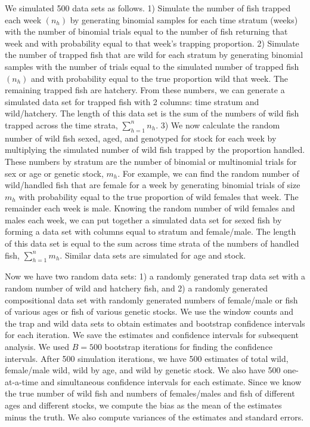 \documentclass[%
                leqno,         %
%
]{nrc1}                          %
\begin{document}
We simulated 500 data sets as follows. 1) Simulate the number of fish trapped each week $(n_h)$ by generating binomial samples for each time stratum (weeks) with the number of binomial trials equal to the number of fish returning that week and with probability equal to that week's trapping proportion. 2) Simulate the number of trapped fish that are wild for each stratum by generating binomial samples with the number of trials equal to the simulated number of trapped fish $(n_h)$ and with probability equal to the true proportion wild that week. The remaining trapped fish are hatchery. From these numbers, we can generate a simulated data set for trapped fish with 2 columns: time stratum and wild/hatchery. The length of this data set is the sum of the numbers of wild fish trapped across the time strata, \(\sum\limits_{h=1}^{n} n_h\). 3) We now calculate the random number of wild fish sexed, aged, and genotyped for stock for each week by multiplying the simulated number of wild fish trapped by the proportion handled. These numbers by stratum are the number of binomial or multinomial trials for sex or age or genetic stock, \(m_h\). For example, we can find the random number of wild/handled fish that are female for a week by generating binomial trials of size \(m_h\) with probability equal to the true proportion of wild females that week. The remainder each week is male. Knowing the random number of wild females and males each week, we can put together a simulated data set for sexed fish by forming a data set with columns equal to stratum and female/male. The length of this data set is equal to the sum across time strata of the numbers of handled fish,  \(\sum\limits_{h=1}^{n} m_h\). Similar data sets are simulated for age and stock.

Now we have two random data sets: 1) a randomly generated trap data set with a random number of wild and hatchery fish, and 2) a randomly generated compositional data set with randomly generated numbers of female/male or fish of various ages or fish of various genetic stocks. We use the window counts and the trap and wild data sets to obtain estimates and bootstrap confidence intervals for each iteration. We save the estimates and confidence intervals for subsequent analysis. We used $B = 500$ bootstrap iterations for finding the confidence intervals. After 500 simulation iterations, we have 500 estimates of total wild, female/male wild, wild by age, and wild by genetic stock. We also have 500 one-at-a-time and simultaneous confidence intervals for each estimate. Since we know the true number of wild fish and numbers of females/males and fish of different ages and different stocks, we compute the bias as the mean of the estimates minus the truth. We also compute variances of the estimates and standard errors.
\end{document}
